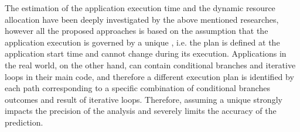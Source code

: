 The estimation of the application execution time and the dynamic resource allocation have been deeply investigated by the above mentioned researches, however all the proposed approaches is based on the assumption that the application execution is governed by a unique \plan, i.e. the plan is defined at the application start time and cannot change during its execution. 
Applications in the real world, on the other hand, can contain conditional branches and iterative loops in their main code, and therefore a different execution plan is identified by each path corresponding to a specific combination of conditional branches outcomes and result of iterative loops. Therefore, assuming a unique \plan strongly impacts the precision of the analysis and severely limits the accuracy of the prediction. 
%
%
%
%
